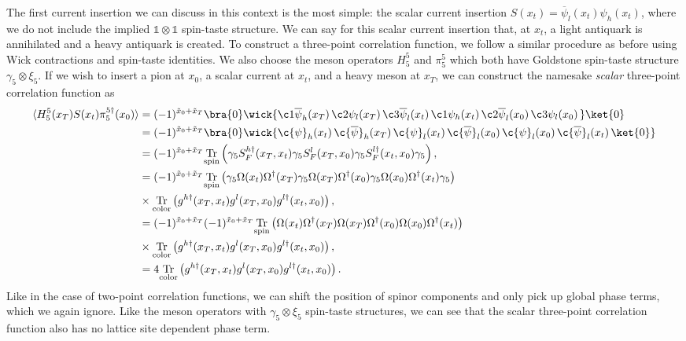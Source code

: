 The first current insertion we can discuss in this context is the most simple: the scalar current insertion $S(x_t) = \overline{\psi}_l (x_t) \psi_h(x_t)$, where we do not include the implied $\mathds{1} \otimes \mathds{1}$ spin-taste structure.  We can say for this scalar current insertion that, at $x_t$, a light antiquark is annihilated and a heavy antiquark is created.  To construct a three-point correlation function, we follow a similar procedure as before using Wick contractions and spin-taste identities.  We also choose the meson operators $H^5_5$ and $\pi^5_5$ which both have Goldstone spin-taste structure $\gamma_5 \otimes\xi_5$.  If we wish to insert a pion at $x_0$, a scalar current at $x_t$, and a heavy meson at $x_T$, we can construct the namesake \textit{scalar} three-point correlation function as
\begin{equation}\label{eq:scalar3ptderive}
\begin{split}
    \langle H^5_5(x_T)S(x_t)\pi^{5\dagger}_5(x_0)\rangle &= (-1)^{\tilde{x}_0+\tilde{x}_T}\bra{0}\wick{
    \c1{\overline{\psi}}_h(x_T)\, \c2{\psi}_l(x_T)\, \c3{\overline{\psi}}_l(x_t) \, \c1{\psi}_h(x_t)\, \c2{\overline{\psi}}_l(x_0)\, \c3{\psi}_l(x_0)\, }\ket{0}\\
    &= (-1)^{\tilde{x}_0+\tilde{x}_T}\bra{0}\wick{
    \c{\psi}_h(x_t) \, \c{\overline{\psi}}_h(x_T) \, \c{\psi}_l(x_t) \, \c{\overline{\psi}}_l(x_0) \, \c{\psi}_l(x_0) \, \c{\overline{\psi}}_l(x_t) \, \ket{0}} \\
    &= (-1)^{\tilde{x}_0+\tilde{x}_T} \underset{\mathrm{spin}}{\mathrm{Tr}}\left(\gamma_5 S_F^{h\dagger}(x_T,x_t)\gamma_5 S_F^l(x_T,x_0) \gamma_5 S_F^{l\dagger}(x_t,x_0)\gamma_5 \right),\\
    &= (-1)^{\tilde{x}_0+\tilde{x}_T} \underset{\mathrm{spin}}{\mathrm{Tr}}\left( \gamma_5 \Omega(x_t)\Omega^\dagger(x_T)\gamma_5 \Omega(x_T)\Omega^\dagger(x_0)\gamma_5\Omega(x_0)\Omega^\dagger(x_t)\gamma_5\right)\\
    &\times \underset{\mathrm{color}}{\mathrm{Tr}} \left( g^{h\dagger}(x_T,x_t)g^l(x_T,x_0)g^{l\dagger}(x_t,x_0) \right),\\
    &= (-1)^{\tilde{x}_0+\tilde{x}_T}(-1)^{\tilde{x}_0+\tilde{x}_T} \underset{\mathrm{spin}}{\mathrm{Tr}}\left( \Omega(x_t)\Omega^\dagger(x_T)\Omega(x_T)\Omega^\dagger(x_0)\Omega(x_0)\Omega^\dagger(x_t)\right)\\
    &\times \underset{\mathrm{color}}{\mathrm{Tr}} \left( g^{h\dagger}(x_T,x_t)g^l(x_T,x_0)g^{l\dagger}(x_t,x_0) \right),\\
    &= 4\underset{\mathrm{color}}{\mathrm{Tr}} \left( g^{h\dagger}(x_T,x_t)g^l(x_T,x_0)g^{l\dagger}(x_t,x_0) \right).
\end{split}
\end{equation}
Like in the case of two-point correlation functions, we can shift the position of spinor components and only pick up global phase terms, which we again ignore.  Like the meson operators with $\gamma_5\otimes\xi_5$ spin-taste structures, we can see that the scalar three-point correlation function also has no lattice site dependent phase term. 

